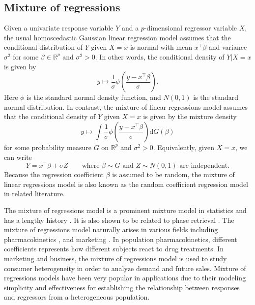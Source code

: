 \documentclass[11pt]{article}
\numberwithin{equation}{section}
\newcommand{\RS}{\mathbb{R}}
\newcommand{\T}{ \top }
\def\qt#1{\qquad\text{#1}}
\newcommand{\diff}{\mathrm{d}} %
\begin{document}
\subsection{Mixture of regressions}
Given a univariate response variable $Y$ and a $p$-dimensional
regressor variable $X$, the usual homoscedastic Gaussian linear
regression model assumes that the conditional distribution of $Y$
given $X = x$ is normal with mean $x^\T \beta$ and variance $\sigma^2$
for some $\beta \in \RS^p$ and $\sigma^2 > 0$. In other words, the
conditional density of $Y | X = x$ is given by  
\begin{equation*}
y \mapsto  \frac{1}{\sigma} \phi \left(\frac{y - x^\T \beta}{\sigma}
\right).
\end{equation*}
Here $\phi$ is the standard normal density function, and  $N(0, 1)$ is the standard normal distribution. In contrast, the mixture of linear regressions model assumes that the
conditional density of $Y$  given $X = x$ is given by the mixture density 
\begin{equation*}
  y \mapsto \int \frac{1}{\sigma} \phi \left(\frac{y - x^\T \beta}{\sigma}
\right) \diff G(\beta)
\end{equation*}
for some probability measure $G$ on $\RS^p$ and $\sigma^2 >0 $. Equivalently, given $X =x$, we can write 
\begin{equation}\label{mixlin}
  Y = x^\T \beta + \sigma Z \qt{where $\beta \sim G$ and $Z \sim N(0,
    1)$ are independent}. 
\end{equation}
Because the regression coefficient $\beta$ is assumed to be random,
the mixture of linear regressions model is also known as the random
coefficient regression model in related literature.

The mixture of regressions model is a prominent mixture model in statistics and has a lengthy history \citep{quandt1958estimation,de1989mixtures}. It is also shown to be related to phase retrieval \citep{netrapalli2013phase,balakrishnan2017statistical}. The mixture of regressions model naturally arises in various fields including pharmacokinetics \citep{lai2003nonparametric}, and marketing \citep{wedel2012market}. In population pharmacokinetics, different coefficients represents how different subjects react to drug treatments. In marketing and business, the mixture of regressions model is used to study consumer heterogeneity in order to analyze demand and future sales. Mixture of regressions models have been very popular in applications due to their modeling simplicity and effectiveness for establishing the relationship between responses and regressors from a heterogeneous population.  
\end{document}
